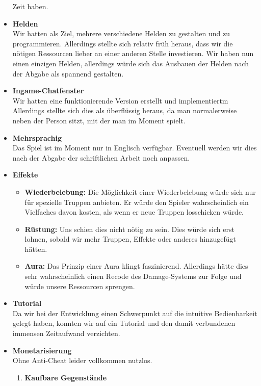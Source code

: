 \begin{itemize}
        Zeit haben.
    \item \textbf{Helden} \\
        Wir hatten als Ziel, mehrere verschiedene Helden zu gestalten und zu programmieren. Allerdings stellte sich relativ früh heraus, dass wir die nötigen Ressourcen
        lieber an einer anderen Stelle investieren. Wir haben nun einen einzigen Helden, allerdings würde sich das Ausbauen der Helden nach der Abgabe als spannend gestalten.
    \item \textbf{Ingame-Chatfenster}\\
        Wir hatten eine funktionierende Version erstellt und implementiertm Allerdings stellte sich dies als überflüssig heraus, da man normalerweise neben der Person sitzt,
        mit der man im Moment spielt.
    \item \textbf{Mehrsprachig} \\
        Das Spiel ist im Moment nur in Englisch verfügbar. Eventuell werden wir dies nach der Abgabe der schriftlichen Arbeit noch anpassen.
    \item \textbf{Effekte}
    \begin{itemize}
        \item \textbf{Wiederbelebung:}
            Die Möglichkeit einer Wiederbelebung würde sich nur für spezielle Truppen anbieten. Er würde den Spieler wahrscheinlich ein Vielfaches davon kosten,
            als wenn er neue Truppen losschicken würde. 
        \item \textbf{Rüstung:}
            Uns schien dies nicht nötig zu sein. Dies würde sich erst lohnen, sobald wir mehr Truppen, Effekte oder anderes hinzugefügt hätten.
        \item \textbf{Aura:}
            Das Prinzip einer Aura klingt faszinierend. Allerdings hätte dies sehr wahrscheinlich einen Recode des Damage-Systems zur Folge und würde unsere Ressourcen sprengen.
    \end{itemize}
    \item \textbf{Tutorial} \\
        Da wir bei der Entwicklung einen Schwerpunkt auf die intuitive Bedienbarkeit gelegt haben, konnten wir auf ein Tutorial und den damit verbundenen immensen Zeitaufwand verzichten.
    \item \textbf{Monetarisierung} \\
    Ohne Anti-Cheat leider vollkommen nutzlos.
    \begin{enumerate}
        \item \textbf{Kaufbare Gegenstände}

\end{enumerate}
\end{itemize}
